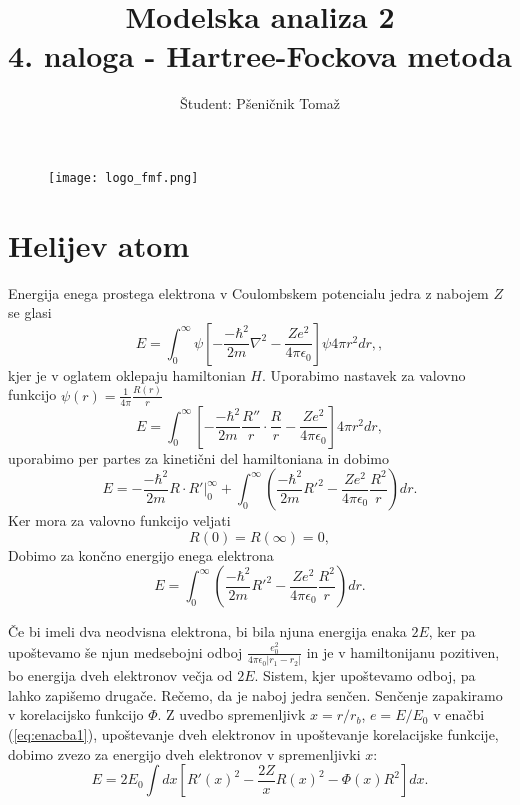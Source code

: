 \documentclass[12pt,a4paper]{article}
\title{\textbf{Modelska analiza 2} \\ 4. naloga - Hartree-Fockova metoda \\}
\author{Študent: Pšeničnik Tomaž}
\begin{document}

	\begin{figure} [h]
  \centering
  \texttt{[image: logo\_fmf.png]}
  \maketitle
\end{figure}
	
	
	
	\newpage
	
	
	
\section*{Helijev atom}




Energija enega prostega elektrona v Coulombskem potencialu jedra z nabojem $Z$ se glasi
\begin{equation*}
E=\int _0 ^{\infty}  \psi \left[ -\frac{-\hbar ^{2}}{2m} \nabla ^{2}  - \frac{Ze^{2}}{4\pi \epsilon_0}\right] \psi 4\pi r^{2}dr,,
\end{equation*}
kjer je v oglatem oklepaju hamiltonian $H$.
Uporabimo nastavek za valovno funkcijo $\psi(r)=\frac{1}{4\pi} \frac{R(r)}{r}$
\begin{equation*}
E= \int _0 ^{\infty} \left[ -\frac{-\hbar ^{2}}{2m}\frac{R''}{r} \cdot \frac{R}{r} - \frac{Ze^{2}}{4\pi \epsilon_0} \right] 4\pi r^{2} dr,
\end{equation*}
uporabimo per partes za kinetični del hamiltoniana in dobimo
\begin{equation*}
E= -\frac{-\hbar ^{2}}{2m}R\cdot R' \biggr| _0 ^{\infty} + \int _0 ^{\infty} \left( \frac{-\hbar ^{2}}{2m}R'^{2} - \frac{Ze^{2}}{4\pi \epsilon_0}  \frac{R^{2}}{r}\right) dr.
\end{equation*}
Ker mora za valovno funkcijo veljati
\begin{equation*}
R(0)=R(\infty)=0,
\end{equation*}
Dobimo za končno energijo enega elektrona
\begin{equation} \label{eq:enacba1}
E=\int _0 ^{\infty} \left( \frac{-\hbar ^{2}}{2m}R'^{2} - \frac{Ze^{2}}{4\pi \epsilon_0}  \frac{R^{2}}{r}\right) dr.
\end{equation}

Če bi imeli dva neodvisna elektrona, bi bila njuna energija enaka $2E$, ker pa upoštevamo še njun medsebojni odboj $\frac{e_0^{2}}{4\pi \epsilon_0 |r_1 -r_2|}$ in je v hamiltonijanu pozitiven, bo energija dveh elektronov večja od $2E$. Sistem, kjer upoštevamo odboj, pa lahko zapišemo drugače. Rečemo, da je naboj jedra senčen. Senčenje zapakiramo v korelacijsko funkcijo $\Phi$. 
Z uvedbo spremenljivk $x=r/r_b$, $e=E/E_0$ v enačbi (\ref{eq:enacba1}), upoštevanje dveh elektronov in upoštevanje korelacijske funkcije, dobimo zvezo za energijo dveh elektronov v spremenljivki $x$:
\begin{equation} \label{eq:enacba2}
E=2E_0 \int dx \left[ R'(x)^{2} - \frac{2Z}{x}R(x)^{2} -\Phi(x) R^{2}\right] dx.
\end{equation}
\end{document}
